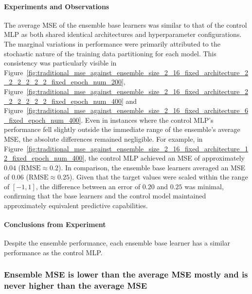 \documentclass{article}
\begin{document}
\paragraph{Experiments and Observations}
The average MSE of the ensemble base learners was similar to that of the control MLP as both shared identical architectures and hyperparameter configurations. The marginal variations in performance were primarily attributed to the stochastic nature of the training data partitioning for each model. This consistency was particularly visible in Figure~\ref{fig:traditional_mse_against_ensemble_size_2_16_fixed_architecture_2_2_2_2_2_2_fixed_epoch_num_200}, Figure~\ref{fig:traditional_mse_against_ensemble_size_2_16_fixed_architecture_2_2_2_2_2_2_fixed_epoch_num_400} and Figure~\ref{fig:traditional_mse_against_ensemble_size_2_16_fixed_architecture_6_fixed_epoch_num_400}. Even in instances where the control MLP's performance fell slightly outside the immediate range of the ensemble's average MSE, the absolute differences remained negligible. For example, in Figure~\ref{fig:traditional_mse_against_ensemble_size_2_16_fixed_architecture_12_fixed_epoch_num_400}, the control MLP achieved an MSE of approximately $0.04$ ($\text{RMSE} \approx 0.2$). In comparison, the ensemble base learners averaged an MSE of $0.06$ ($\text{RMSE} \approx 0.25$). Given that the target values were scaled within the range of $[-1, 1]$, the difference between an error of $0.20$ and $0.25$ was minimal, confirming that the base learners and the control model maintained approximately equivalent predictive capabilities. 

\paragraph{Conclusions from Experiment}
Despite the ensemble performance, each ensemble base learner has a similar performance as the control MLP. 


\subsubsection{Ensemble MSE is lower than the average MSE mostly and is never higher than the average MSE}
\end{document}
